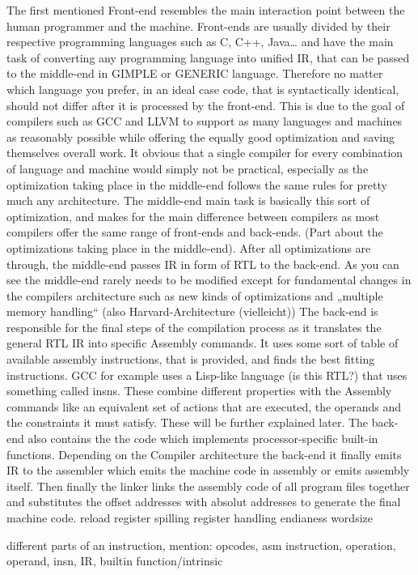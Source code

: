 The first mentioned Front-end resembles the main interaction point between the human programmer and the machine. Front-ends are usually divided by their respective programming languages such as C, C++, Java…  and have the main task of converting any programming language into unified IR, that can be passed to the middle-end in GIMPLE or GENERIC language. Therefore no matter which language you prefer, in an ideal case code, that is syntactically identical, should not differ after it is processed by the front-end. This is due to the goal of compilers such as GCC and LLVM to support as many languages and machines as reasonably possible while offering the equally good optimization and saving themselves overall work. It obvious that a single compiler for every combination of language and machine would simply not be practical, especially as the optimization taking place in the middle-end follows the same rules for pretty much any architecture.
The middle-end main task is basically this sort of optimization, and makes for the main difference between compilers as most compilers offer the same range of front-ends and back-ends. (Part about the optimizations taking place in the middle-end). After all optimizations are through, the middle-end passes IR in form of RTL to the back-end. As you can see the middle-end rarely needs to be modified except for fundamental changes in the compilers architecture such as new kinds of optimizations and „multiple memory handling“ (also Harvard-Architecture (vielleicht))
The back-end is responsible for the final steps of the compilation process as it translates the general RTL IR into specific Assembly commands. It uses some sort of table of available assembly instructions, that is provided, and finds the best fitting instructions. GCC for example uses a Lisp-like language (is this RTL?) that uses something called insns. These combine different properties with the  Assembly commands like an equivalent set of actions that are executed, the  operands and the constraints it must satisfy. These will be further explained later. The back-end also contains the the code which implements processor-specific built-in functions.
Depending on the Compiler architecture the back-end it finally emits IR to the assembler which emits the machine code in assembly or emits assembly itself. Then finally the linker links the assembly code of all program files together and substitutes the offset addresses with absolut addresses to generate the final machine code.
reload
register spilling
register handling
endianess
wordsize

different parts of an instruction, mention: opcodes, asm instruction, operation, operand, insn, IR, builtin function/intrinsic

